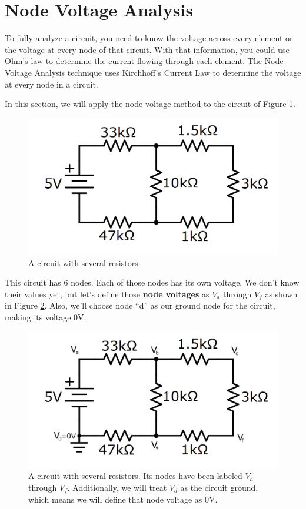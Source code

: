 \section{Node Voltage Analysis}
To fully analyze a circuit, you need to know the voltage across every element or the voltage at every node of that circuit. With that information, you could use Ohm's law to determine the current flowing through each element. The Node Voltage Analysis technique uses Kirchhoff's Current Law to determine the voltage at every node in a circuit. 
\par
In this section, we will apply the node voltage method to the circuit of Figure \ref{nodeVoltageExCircuit}. 
\begin{figure}[h!]
\centering
\includegraphics[width=4.65in]{figures/nodeVoltageExCircuit.png}
\caption{A circuit with several resistors.}
\label{nodeVoltageExCircuit}
\end{figure}
This circuit has 6 nodes. Each of those nodes has its own voltage. We don't know their values yet, but let's define those \textbf{node voltages} as $V_a$ through $V_f$ as shown in Figure \ref{nodeVoltageExCircuit_nodeVsAnnotated}. Also, we'll choose node ``d'' as our ground node for the circuit, making its voltage 0V.
\begin{figure}[h!]
\centering
\includegraphics[width=4.65in]{figures/nodeVoltageExCircuit_nodeVsAnnotated.png}
\caption{A circuit with several resistors. Its nodes have been labeled $V_a$ through $V_f$. Additionally, we will treat $V_d$ as the circuit ground, which means we will define that node voltage as 0V.}
\label{nodeVoltageExCircuit_nodeVsAnnotated}
\end{figure}

